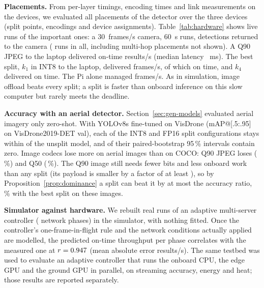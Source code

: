 \documentclass[journal,twocolumn,10pt]{IEEEtran}
\begin{document}
\textbf{Placements.} From per-layer timings, encoding times and link measurements on the devices, we evaluated all \HwNPlacements{} placements of the detector over the three devices (split points, encodings and device assignments). Table~\ref{tab:hardware} shows live runs of the important ones: a 30~frames/s camera, 60~s runs, detections returned to the camera (\HwLiveRuns{} runs in all, including multi-hop placements not shown). A Q90 JPEG to the laptop delivered \HwJpegOnTime{} on-time results/s (median latency \HwJpegLatMs~ms). The best split, $k_1$ in INT8 to the laptop, delivered \HwKOneFps{} frames/s, of which \HwKOneOnTime{} on time, and $k_4$ delivered \HwKFourOnTime{} on time. The Pi alone managed \HwPiSoloFps{} frames/s. As in simulation, image offload beats every split; a split is faster than onboard inference on this slow computer but rarely meets the deadline.

\begin{table}[t]
\centering
\caption{Live placements on the testbed (medians over runs; on time: within 300~ms).}
\label{tab:hardware}
\resizebox{\columnwidth}{!}{}
\end{table}

\textbf{Accuracy with an aerial detector.} Section~\ref{sec:gen-models} evaluated aerial imagery only zero-shot. With YOLOv8s fine-tuned on VisDrone (mAP@[.5:.95] \HwVdFullMap{} on VisDrone2019-DET val), each of the \HwVdSplitN{} INT8 and FP16 split configurations stays within \HwVdSplitMaxAbsDelta{} of the unsplit model, and \HwVdSplitAllCiZero{} of their paired-bootstrap 95\,\% intervals contain zero. Image codecs lose more on aerial images than on COCO: Q90 JPEG loses \HwVdJpegNinetyDelta{} (\HwVdJpegNinetyPct\,\%) and Q50 \HwVdJpegFiftyDelta{} (\HwVdJpegFiftyPct\,\%). The Q90 image still needs fewer bits and less onboard work than any split (its payload is smaller by a factor of at least \GenRatioMin), so by Proposition~\ref{prop:dominance} a split can beat it by at most the accuracy ratio, \HwVdBoundPct\,\% with the best split on these images.

\textbf{Simulator against hardware.} We rebuilt \HwSimRuns{} real runs of an adaptive multi-server controller (\HwSimPhases{} network phases) in the simulator, with nothing fitted. Once the controller's one-frame-in-flight rule and the network conditions actually applied are modelled, the predicted on-time throughput per phase correlates with the measured one at $r=0.947$ (mean absolute error \HwSimMae{} results/s). The same testbed was used to evaluate an adaptive controller that runs the onboard CPU, the edge GPU and the ground GPU in parallel, on streaming accuracy, energy and heat; those results are reported separately.
\end{document}
